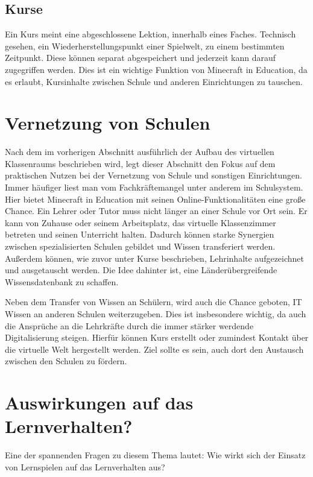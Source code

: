 \subsection{Kurse}

Ein Kurs meint eine abgeschlossene Lektion, innerhalb eines Faches. Technisch gesehen, ein Wiederherstellungspunkt einer Spielwelt, zu einem bestimmten Zeitpunkt. Diese können separat abgespeichert und jederzeit kann darauf zugegriffen werden. Dies ist ein wichtige Funktion von Minecraft in Education, da es erlaubt, Kursinhalte zwischen Schule und anderen Einrichtungen zu tauschen.

\section{Vernetzung von Schulen}

Nach dem im vorherigen Abschnitt ausführlich der Aufbau des virtuellen Klassenraums beschrieben wird, legt dieser Abschnitt den Fokus auf dem praktischen Nutzen bei der Vernetzung von Schule und sonstigen Einrichtungen.
Immer häufiger liest man vom Fachkräftemangel unter anderem im Schulsystem. Hier bietet Minecraft in Education mit seinen Online-Funktionalitäten eine große Chance. Ein Lehrer oder Tutor muss nicht länger an einer Schule vor Ort sein. Er kann von Zuhause oder seinem Arbeitsplatz, das virtuelle Klassenzimmer betreten und seinen Unterricht halten. Dadurch können starke Synergien zwischen spezialisierten Schulen gebildet und Wissen transferiert werden.
Außerdem können, wie zuvor unter Kurse beschrieben, Lehrinhalte aufgezeichnet und ausgetauscht werden.
Die Idee dahinter ist, eine Länderübergreifende Wissensdatenbank zu schaffen.

Neben dem Transfer von Wissen an Schülern, wird auch die Chance geboten, IT Wissen an anderen Schulen weiterzugeben. Dies ist insbesondere wichtig, da auch die Ansprüche an die Lehrkräfte durch die immer stärker werdende Digitalisierung steigen. Hierfür können Kurs erstellt oder zumindest Kontakt über die virtuelle Welt hergestellt werden. Ziel sollte es sein, auch dort den Austausch zwischen den Schulen zu fördern.

\section{Auswirkungen auf das Lernverhalten?}

Eine der spannenden Fragen zu diesem Thema lautet: Wie wirkt sich der Einsatz von Lernspielen auf das Lernverhalten aus?

